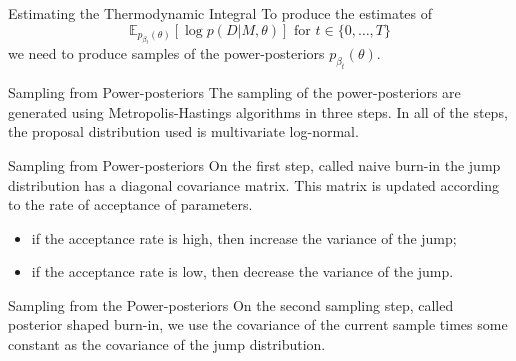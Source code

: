 \documentclass{beamer}
\newcommand{\expectation}{\mathbb{E}}
\begin{document}
\begin{frame}{Estimating the Thermodynamic Integral}
To produce the estimates of 
\begin{equation*}
    \expectation_{p_{\beta_{t}} (\theta)}[\log p(D | M, \theta)]
    \text{ for }
    t \in \{0, \ldots, T\}
\end{equation*}    
we need to produce samples of the 
power-posteriors $p_{\beta_{t}} (\theta)$.
\end{frame}

%
%
%
%
\begin{frame}{Sampling from Power-posteriors}
The sampling of the power-posteriors are generated using 
Metropolis-Hastings algorithms in three steps. \pause In all of the 
steps, the proposal distribution used is multivariate log-normal.
\end{frame}


\begin{frame}{Sampling from Power-posteriors}
On the first step, called \alert{naive burn-in} the jump distribution 
has a diagonal covariance matrix. \pause This matrix is updated 
according to the rate of acceptance of parameters.

\pause
\begin{itemize}
\item{if the acceptance rate is high, then increase the variance of the
    jump;}

\pause
\item{if the acceptance rate is low, then decrease the variance of the 
    jump.}
\end{itemize}

\pause
\end{frame}

\begin{frame}{Sampling from the Power-posteriors}
On the second sampling step, called \alert{posterior shaped burn-in}, we
use the covariance of the current sample times some constant as the 
covariance of the jump distribution.
\end{frame}
\end{document}
